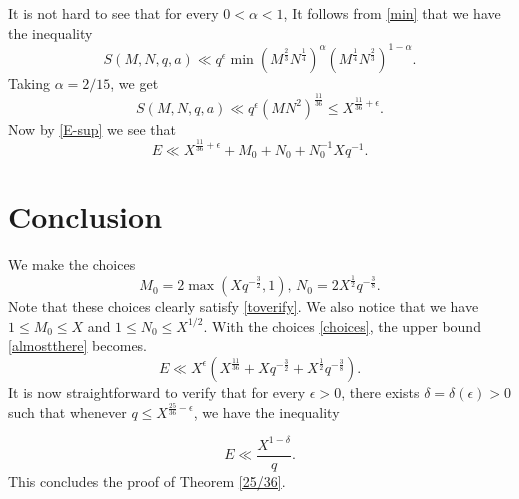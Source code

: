 \documentclass[a4paper, 11pt]{amsart}
\theoremstyle{plain}
\theoremstyle{definition}
\begin{document}
It is not hard to see that for every $0<\alpha<1$, It follows from \eqref{min} that we have the inequality
%
\begin{equation}\label{alfalfa}
S(M,N,q,a)\ll q^{\epsilon}\min\left(M^{\frac{2}{3}}N^{\frac{1}{4}}\right)^{\alpha}\left(M^{\frac{1}{4}}N^{\frac{2}{3}}\right)^{1-\alpha}.
\end{equation}
%
Taking $\alpha=2/15$, we get
%
$$
S(M,N,q,a)\ll q^{\epsilon} \left(MN^2\right)^{\frac{11}{36}} \leq X^{\frac{11}{36}+\epsilon}.
$$
%
Now by \eqref{E-sup} we see that
%
\begin{equation}\label{almostthere}
E\ll  X^{\frac{11}{36}+\epsilon}+ M_0 + N_0 + N^{-1}_0Xq^{-1}.
\end{equation}
%
\section{Conclusion}
%
We make the choices
%
\begin{equation}\label{choices}
M_0=2\max(Xq^{-\frac{3}{2}},1),\,N_0=2 X^{\frac{1}{2}}q^{-\frac{3}{8}}.
\end{equation}
%
Note that these choices clearly satisfy \eqref{toverify}. We also notice that we have $1\leq M_0\leq X$ and $1\leq N_0\leq X^{1/2}$.
%
With the choices \eqref{choices}, the upper bound \eqref{almostthere} becomes.
%
$$
E\ll X^{\epsilon}\left( X^{\frac{11}{36}} + Xq^{-\frac32} +X^{\frac12}q^{-\frac38}\right).
$$
It is now straightforward to verify that for every $\epsilon>0$, there exists $\delta=\delta(\epsilon)>0$ such that whenever $q\leq X^{\frac{25}{36}-\epsilon}$, we have the inequality

$$
E\ll \frac{X^{1-\delta}}q.
$$
This concludes the proof of Theorem \ref{25/36}.
%
%


%
\end{document}
